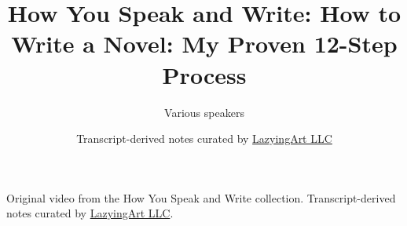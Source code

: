 \documentclass[11pt,oneside]{book}
\begin{document}
\frontmatter
\title{How You Speak and Write: How to Write a Novel: My Proven 12-Step Process}
\author{Various speakers}
\date{Transcript-derived notes curated by \href{https://lazying.art}{LazyingArt LLC}}
\maketitle
\begin{center}
\small Original video from the How You Speak and Write collection. Transcript-derived notes curated by \href{https://lazying.art}{LazyingArt LLC}.
\end{center}
\clearpage
\mainmatter

\end{document}
